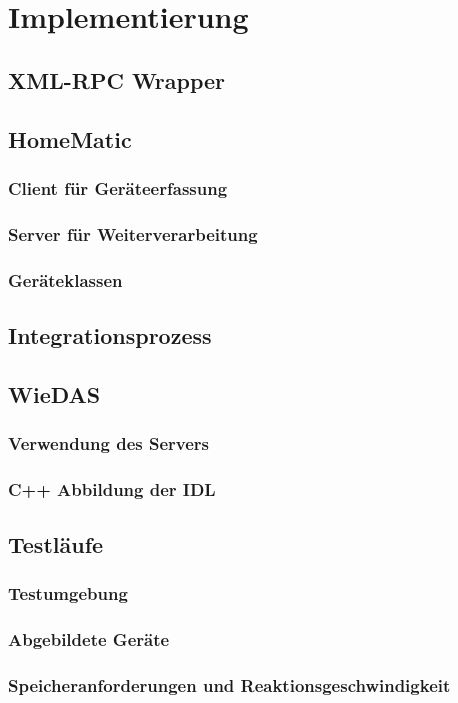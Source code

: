 \chapter{Implementierung}
\label{implementierung}

\section{XML-RPC Wrapper}

\section{HomeMatic}

\subsection{Client für Geräteerfassung}

\subsection{Server für Weiterverarbeitung}

\subsection{Geräteklassen}

\section{Integrationsprozess}

\section{WieDAS}

\subsection{Verwendung des Servers}

\subsection{C++ Abbildung der IDL}

\section{Testläufe}

\subsection{Testumgebung}

\subsection{Abgebildete Geräte}

\subsection{Speicheranforderungen und Reaktionsgeschwindigkeit}
